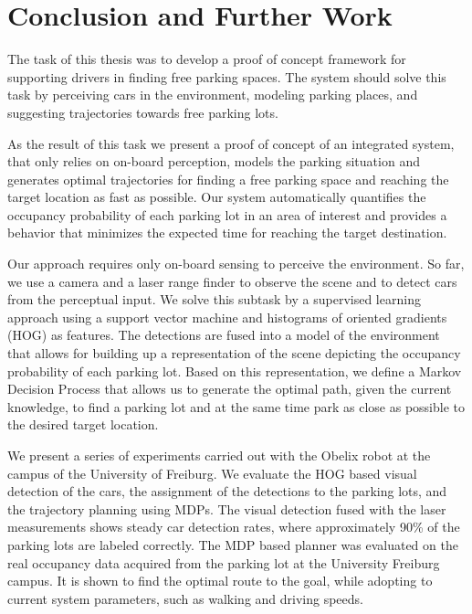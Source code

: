 
\chapter{Conclusion and Further Work} %
\label{cha:conclusion_and_further_work}

    The task of this thesis was to develop a proof of concept framework for
    supporting drivers in finding free parking spaces. The system should solve
    this task by perceiving cars in the environment, modeling parking places,
    and suggesting trajectories towards free parking lots.

    As the result of this task we present a proof of concept of an integrated
    system, that only relies on on-board perception, models the parking
    situation and generates optimal trajectories for finding a free parking
    space and reaching the target location as fast as possible. Our system
    automatically quantifies the occupancy probability of each parking lot in
    an area of interest and provides a behavior that minimizes the expected
    time for reaching the target destination.

    Our approach requires only on-board sensing to perceive the environment.
    So far, we use a camera and a laser range finder to observe the scene and
    to detect cars from the perceptual input. We solve this subtask by a
    supervised learning approach using a support vector machine and histograms
    of oriented gradients (HOG) as features. The detections are fused into a
    model of the environment that allows for building up a representation of
    the scene depicting the occupancy probability of each parking lot. Based
    on this representation, we define a Markov Decision Process that allows us
    to generate the optimal path, given the current knowledge, to find a
    parking lot and at the same time park as close as possible to the desired
    target location.

    We present a series of experiments carried out with the Obelix robot at
    the campus of the University of Freiburg. We evaluate the HOG based visual
    detection of the cars, the assignment of the detections to the parking
    lots, and the trajectory planning using MDPs. The visual detection fused
    with the laser measurements shows steady car detection rates, where
    approximately 90\% of the parking lots are labeled correctly. The MDP
    based planner was evaluated on the real occupancy data acquired from the
    parking lot at the University Freiburg campus. It is shown to find the
    optimal route to the goal, while adopting to current system parameters,
    such as walking and driving speeds.

